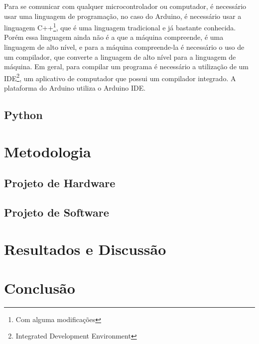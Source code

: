 Para se comunicar com qualquer microcontrolador ou computador, é necessário usar uma linguagem de programação, no caso do Arduino, é necessário usar a linguagem C++\footnote{Com alguma modificações}, que é uma linguagem tradicional e já bastante conhecida. Porém essa linguagem ainda não é a que a máquina compreende, é uma linguagem de alto nível, e para a máquina compreende-la é necessário o uso de um compilador, que converte a linguagem de alto nível para a linguagem de máquina. Em geral, para compilar um programa é necessário a utilização de um IDE\footnote{Integrated Development Environment}, um aplicativo de computador que possui um compilador integrado. A plataforma do Arduino utiliza o Arduino IDE\cite{chavier2016}. 


\section{Python}

\chapter[Metodologia]{Metodologia}

\section{Projeto de Hardware}

\section {Projeto de Software}

\chapter{Resultados e Discussão}

\chapter{Conclusão}